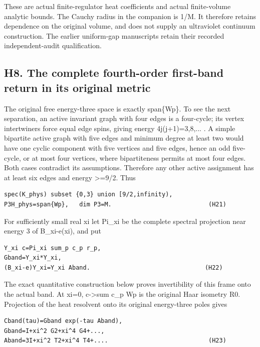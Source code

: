 \documentclass[11pt,a4paper]{article}
\renewcommand{\[}{\begingroup\small\originaldisplaystart}
\renewcommand{\]}{\originaldisplayend\endgroup}
\begin{document}
These are actual finite-regulator heat coefficients and actual
finite-volume analytic bounds. The Cauchy radius in the companion is
1/M. It therefore retains dependence on the original volume, and does
not supply an ultraviolet continuum construction. The earlier
uniform-gap manuscripts retain their recorded independent-audit
qualification.

\subsection{H8. The complete fourth-order first-band return in its
original
metric}\label{h8.-the-complete-fourth-order-first-band-return-in-its-original-metric}

The original free energy-three space is exactly span\{Wp\}. To see the
next separation, an active invariant graph with four edges is a
four-cycle; its vertex intertwiners force equal edge spins, giving
energy 4j(j+1)=3,8,... . A simple bipartite active graph with five edges
and minimum degree at least two would have one cyclic component with
five vertices and five edges, hence an odd five-cycle, or at most four
vertices, where bipartiteness permits at most four edges. Both cases
contradict its assumptions. Therefore any other active assignment has at
least six edges and energy \textgreater=9/2. Thus

\begin{verbatim}
spec(K_phys) subset {0,3} union [9/2,infinity),
P3H_phys=span{Wp},   dim P3=M.                           (H21)
\end{verbatim}

For sufficiently small real xi let Pi\_xi be the complete spectral
projection near energy 3 of B\_xi-e(xi), and put

\begin{verbatim}
Y_xi c=Pi_xi sum_p c_p r_p,
Gband=Y_xi*Y_xi,
(B_xi-e)Y_xi=Y_xi Aband.                                (H22)
\end{verbatim}

The exact quantitative construction below proves invertibility of this
frame onto the actual band. At xi=0, c-\textgreater sum c\_p Wp is the
original Haar isometry R0. Projection of the heat resolvent onto its
original energy-three poles gives

\begin{verbatim}
Cband(tau)=Gband exp(-tau Aband),
Gband=I+xi^2 G2+xi^4 G4+...,
Aband=3I+xi^2 T2+xi^4 T4+....                            (H23)
\end{verbatim}
\end{document}
